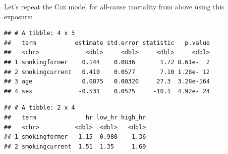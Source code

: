 \documentclass[
]{book}
\newenvironment{Shaded}{\begin{snugshade}}{\end{snugshade}}
\newcommand{\DataTypeTok}[1]{\textcolor[rgb]{0.13,0.29,0.53}{#1}}
\newcommand{\FloatTok}[1]{\textcolor[rgb]{0.00,0.00,0.81}{#1}}
\newcommand{\KeywordTok}[1]{\textcolor[rgb]{0.13,0.29,0.53}{\textbf{#1}}}
\newcommand{\NormalTok}[1]{#1}
\newcommand{\OperatorTok}[1]{\textcolor[rgb]{0.81,0.36,0.00}{\textbf{#1}}}
\newcommand{\StringTok}[1]{\textcolor[rgb]{0.31,0.60,0.02}{#1}}
\begin{document}
Let's repeat the Cox model for all-cause mortality from above using this exposure:

\begin{Shaded}
\end{Shaded}

\begin{verbatim}
## # A tibble: 4 x 5
##   term           estimate std.error statistic   p.value
##   <chr>             <dbl>     <dbl>     <dbl>     <dbl>
## 1 smokingformer    0.144    0.0836       1.72 8.61e-  2
## 2 smokingcurrent   0.410    0.0577       7.10 1.28e- 12
## 3 age              0.0875   0.00320     27.3  3.28e-164
## 4 sex             -0.531    0.0525     -10.1  4.92e- 24
\end{verbatim}

\begin{Shaded}
\end{Shaded}

\begin{verbatim}
## # A tibble: 2 x 4
##   term              hr low_hr high_hr
##   <chr>          <dbl>  <dbl>   <dbl>
## 1 smokingformer   1.15  0.980    1.36
## 2 smokingcurrent  1.51  1.35     1.69
\end{verbatim}
\end{document}
